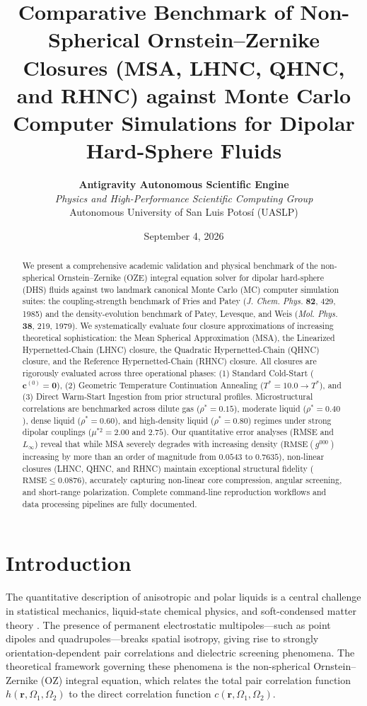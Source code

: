 \documentclass[11pt,a4paper]{article}
\title{\textbf{Comparative Benchmark of Non-Spherical Ornstein--Zernike Closures (MSA, LHNC, QHNC, and RHNC) against Monte Carlo Computer Simulations for Dipolar Hard-Sphere Fluids}}
\author{
    \textbf{Antigravity Autonomous Scientific Engine} \\
    \textit{Physics and High-Performance Scientific Computing Group} \\
    Autonomous University of San Luis Potos\'i (UASLP)
}
\date{September 4, 2026}
\begin{document}
\maketitle

\begin{abstract}
We present a comprehensive academic validation and physical benchmark of the non-spherical Ornstein--Zernike (OZE) integral equation solver for dipolar hard-sphere (DHS) fluids against two landmark canonical Monte Carlo (MC) computer simulation suites: the coupling-strength benchmark of Fries and Patey (\textit{J. Chem. Phys.} \textbf{82}, 429, 1985) and the density-evolution benchmark of Patey, Levesque, and Weis (\textit{Mol. Phys.} \textbf{38}, 219, 1979). We systematically evaluate four closure approximations of increasing theoretical sophistication: the Mean Spherical Approximation (MSA), the Linearized Hypernetted-Chain (LHNC) closure, the Quadratic Hypernetted-Chain (QHNC) closure, and the Reference Hypernetted-Chain (RHNC) closure. All closures are rigorously evaluated across three operational phases: (1) Standard Cold-Start ($\mathbf{c}^{(0)} = \mathbf{0}$), (2) Geometric Temperature Continuation Annealing ($T^* = 10.0 \to T^*$), and (3) Direct Warm-Start Ingestion from prior structural profiles. Microstructural correlations are benchmarked across dilute gas ($\rho^* = 0.15$), moderate liquid ($\rho^* = 0.40$), dense liquid ($\rho^* = 0.60$), and high-density liquid ($\rho^* = 0.80$) regimes under strong dipolar couplings ($\mu^{*2} = 2.00$ and $2.75$). Our quantitative error analyses (RMSE and $L_\infty$) reveal that while MSA severely degrades with increasing density ($\text{RMSE}(g^{000})$ increasing by more than an order of magnitude from $0.0543$ to $0.7635$), non-linear closures (LHNC, QHNC, and RHNC) maintain exceptional structural fidelity ($\text{RMSE} \le 0.0876$), accurately capturing non-linear core compression, angular screening, and short-range polarization. Complete command-line reproduction workflows and data processing pipelines are fully documented.
\end{abstract}

\section{Introduction}

The quantitative description of anisotropic and polar liquids is a central challenge in statistical mechanics, liquid-state chemical physics, and soft-condensed matter theory \cite{hansen2013theory, gray1984theory}. The presence of permanent electrostatic multipoles---such as point dipoles and quadrupoles---breaks spatial isotropy, giving rise to strongly orientation-dependent pair correlations and dielectric screening phenomena. The theoretical framework governing these phenomena is the non-spherical Ornstein--Zernike (OZ) integral equation, which relates the total pair correlation function $h(\mathbf{r}, \Omega_1, \Omega_2)$ to the direct correlation function $c(\mathbf{r}, \Omega_1, \Omega_2)$.
\end{document}
